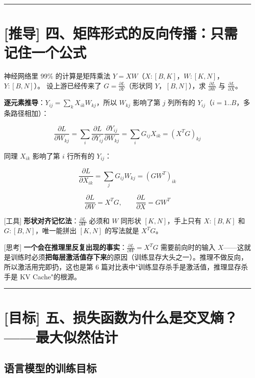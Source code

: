 \vspace{0.8em}\hrule\vspace{0.8em}

\section{[推导] 四、矩阵形式的反向传播：只需记住一个公式}

神经网络里 99\% 的计算是矩阵乘法 $Y = XW$（$X: [B, K]$，$W: [K, N]$，$Y: [B, N]$）。
设上游已经传来了 $G = \frac{\partial L}{\partial Y}$（形状同 $Y$，$[B, N]$），求 $\frac{\partial L}{\partial W}$ 与 $\frac{\partial L}{\partial X}$。

\textbf{逐元素推导}：$Y_{ij} = \sum_k X_{ik} W_{kj}$，所以 $W_{kj}$ 影响了第 $j$ 列所有的 $Y_{ij}$（$i = 1..B$，多条路径相加）：

\[
\frac{\partial L}{\partial W_{kj}} = \sum_i \frac{\partial L}{\partial Y_{ij}} \frac{\partial Y_{ij}}{\partial W_{kj}} = \sum_i G_{ij} X_{ik} = (X^T G)_{kj}
\]

同理 $X_{ik}$ 影响了第 $i$ 行所有的 $Y_{ij}$：

\[
\frac{\partial L}{\partial X_{ik}} = \sum_j G_{ij} W_{kj} = (G W^T)_{ik}
\]

\[
\boxed{\ \frac{\partial L}{\partial W} = X^T G, \qquad \frac{\partial L}{\partial X} = G W^T\ }
\]

\begin{noteBox}[核心导读与背景]
{}[工具] \textbf{形状对齐记忆法}：$\frac{\partial L}{\partial W}$ 必须和 $W$ 同形状 $[K, N]$，手上只有 $X: [B, K]$ 和 $G: [B, N]$，唯一能拼出 $[K, N]$ 的写法就是 $X^T G$。

{}[思考] \textbf{一个会在推理里反复出现的事实}：$\frac{\partial L}{\partial W} = X^T G$ 需要前向时的输入 $X$——这就是训练时必须\textbf{把每层激活值存下来}的原因（训练显存大头之一）。推理不做反向，所以激活用完即扔，这也是第 6 篇对比表中"训练显存杀手是激活值，推理显存杀手是 KV Cache"的根源。
\end{noteBox}

\vspace{0.8em}\hrule\vspace{0.8em}

\section{[目标] 五、损失函数为什么是交叉熵？——最大似然估计}

\subsection{语言模型的训练目标}

